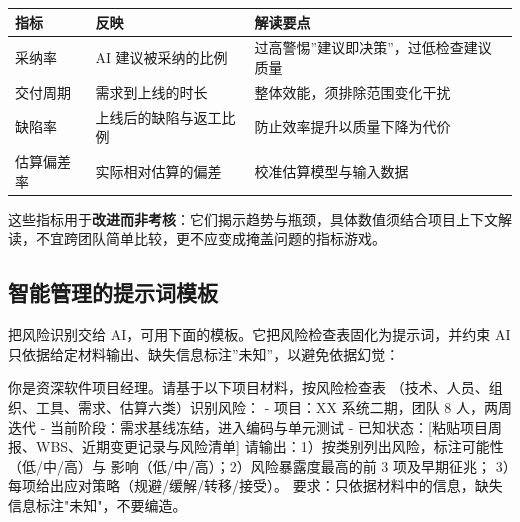 \documentclass[12pt,a4paper,twoside,openany]{ctexbook}
\numberwithin{figure}{chapter}
\numberwithin{table}{chapter}
\newenvironment{Shaded}{}{}
\newcommand{\NormalTok}[1]{#1}
\newcounter{none}
\begin{document}
{\def\LTcaptype{none} %
\begin{longtable}[]{@{}
  >{\raggedright\arraybackslash}p{}
  >{\raggedright\arraybackslash}p{}
  >{\raggedright\arraybackslash}p{}@{}}
\toprule\noalign{}
\begin{minipage}[b]{\linewidth}\raggedright
指标
\end{minipage} & \begin{minipage}[b]{\linewidth}\raggedright
反映
\end{minipage} & \begin{minipage}[b]{\linewidth}\raggedright
解读要点
\end{minipage} \\
\midrule\noalign{}
\endhead
\bottomrule\noalign{}
\endlastfoot
采纳率 & AI 建议被采纳的比例 &
过高警惕''建议即决策''，过低检查建议质量 \\
交付周期 & 需求到上线的时长 & 整体效能，须排除范围变化干扰 \\
缺陷率 & 上线后的缺陷与返工比例 & 防止效率提升以质量下降为代价 \\
估算偏差率 & 实际相对估算的偏差 & 校准估算模型与输入数据 \\
\end{longtable}
}

这些指标用于\textbf{改进而非考核}：它们揭示趋势与瓶颈，具体数值须结合项目上下文解读，不宜跨团队简单比较，更不应变成掩盖问题的指标游戏。

\subsection{智能管理的提示词模板}\label{ux667aux80fdux7ba1ux7406ux7684ux63d0ux793aux8bcdux6a21ux677f}

把风险识别交给 AI，可用下面的模板。它把风险检查表固化为提示词，并约束 AI
只依据给定材料输出、缺失信息标注''未知''，以避免依据幻觉：

\begin{Shaded}
\begin{Highlighting}[]
\NormalTok{你是资深软件项目经理。请基于以下项目材料，按风险检查表}
\NormalTok{（技术、人员、组织、工具、需求、估算六类）识别风险：}
\NormalTok{{-} 项目：XX 系统二期，团队 8 人，两周迭代}
\NormalTok{{-} 当前阶段：需求基线冻结，进入编码与单元测试}
\NormalTok{{-} 已知状态：[粘贴项目周报、WBS、近期变更记录与风险清单]}
\NormalTok{请输出：1）按类别列出风险，标注可能性（低/中/高）与}
\NormalTok{影响（低/中/高）；2）风险暴露度最高的前 3 项及早期征兆；}
\NormalTok{3）每项给出应对策略（规避/缓解/转移/接受）。}
\NormalTok{要求：只依据材料中的信息，缺失信息标注"未知"，不要编造。}
\end{Highlighting}
\end{Shaded}
\end{document}
